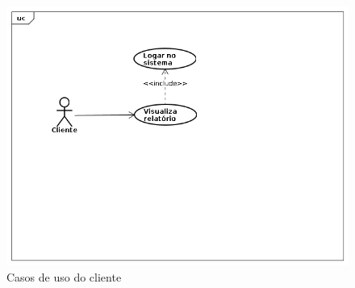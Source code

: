 \begin{figure}[hb]
    \begin{center}
        \includegraphics[scale=0.5]{img/caso-uso-cliente.png}
        \caption{Casos de uso do cliente}
        \label{fig:caso-uso-cliente}
    \end{center}
\end{figure}

